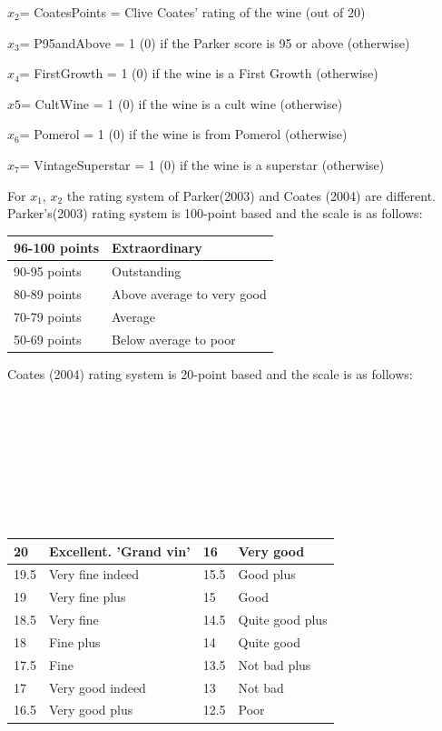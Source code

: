 \documentclass[11pt]{article}
\begin{document}
$x_2$=   CoatesPoints = Clive Coates’ rating of the wine (out of 20)

$x_3$=   P95andAbove = 1 (0) if the Parker score is 95 or above (otherwise)

$x_4$=   FirstGrowth = 1 (0) if the wine is a First Growth (otherwise)

$x5$=   CultWine = 1 (0) if the wine is a cult wine (otherwise)

$x_6$=   Pomerol = 1 (0) if the wine is from Pomerol (otherwise)

$x_7$=   VintageSuperstar = 1 (0) if the wine is a superstar (otherwise)


For $x_1$, $x_2$ the rating system of Parker(2003) and Coates  (2004) are different.\\ Parker's(2003) rating system is 100-point based and the scale is as follows:
\begin{table}[h]
\begin{tabular}{|l|l|}
\hline
96-100 points & Extraordinary              \\ \hline
90-95 points  & Outstanding                \\ \hline
80-89 points  & Above average to very good \\ \hline
70-79 points  & Average                    \\ \hline
50-69 points  & Below average to poor      \\ \hline
\end{tabular}
\end{table}
Coates  (2004) rating system is 20-point based and the scale is as follows:\\\\\\\\\\\\\\\\\\

\begin{table}[h]
\begin{tabular}{|l|l|l|l|}
\hline
20   & Excellent. ’Grand vin’ & 16   & Very good       \\ \hline
19.5 & Very fine indeed       & 15.5 & Good plus       \\ \hline
19   & Very fine plus         & 15   & Good            \\ \hline
18.5 & Very fine              & 14.5 & Quite good plus \\ \hline
18   & Fine plus              & 14   & Quite good      \\ \hline
17.5 & Fine                   & 13.5 & Not bad plus    \\ \hline
17   & Very good indeed       & 13   & Not bad         \\ \hline
16.5 & Very good plus         & 12.5 & Poor            \\ \hline
\end{tabular}
\end{table}
\end{document}
